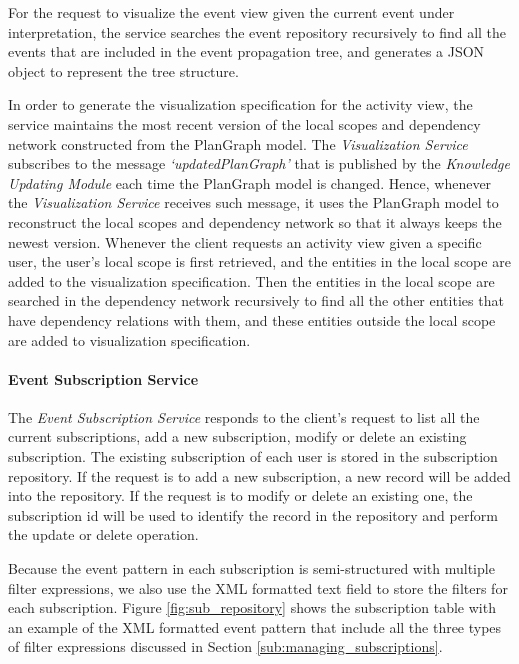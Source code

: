 For the request to visualize the event view given the current event under interpretation, the service searches the event repository recursively to find all the events that are included in the event propagation tree, and generates a JSON object to represent the tree structure.

In order to generate the visualization specification for the activity view, the service maintains the most recent version of the local scopes and dependency network constructed from the PlanGraph model. The \emph{Visualization Service} subscribes to the message \emph{`updatedPlanGraph'} that is published by the \emph{Knowledge Updating Module} each time the PlanGraph model is changed. Hence, whenever the \emph{Visualization Service} receives such message, it uses the PlanGraph model to reconstruct the local scopes and dependency network so that it always keeps the newest version. Whenever the client requests an activity view given a specific user, the user's local scope is first retrieved, and the entities in the local scope are added to the visualization specification. Then the entities in the local scope are searched in the dependency network recursively to find all the other entities that have dependency relations with them, and these entities outside the local scope are added to visualization specification.

\paragraph*{Event Subscription Service} %
\label{par:event_subscription_service}
The \emph{Event Subscription Service} responds to the client's request to list all the current subscriptions, add a new subscription, modify or delete an existing subscription. The existing subscription of each user is stored in the subscription repository. If the request is to add a new subscription, a new record will be added into the repository. If the request is to modify or delete an existing one, the subscription id will be used to identify the record in the repository and perform the update or delete operation. 

Because the event pattern in each subscription is semi-structured with multiple filter expressions, we also use the XML formatted text field to store the filters for each subscription. Figure \ref{fig:sub_repository} shows the subscription table with an example of the XML formatted event pattern that include all the three types of filter expressions discussed in Section \ref{sub:managing_subscriptions}.

